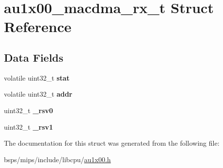\hypertarget{structau1x00__macdma__rx__t}{}\section{au1x00\+\_\+macdma\+\_\+rx\+\_\+t Struct Reference}
\label{structau1x00__macdma__rx__t}
\subsection*{Data Fields}
\begin{DoxyCompactItemize}
\item 
\mbox{\label{structau1x00__macdma__rx__t_a10fff52a98e49df1d3680896ecc9d660}} 
volatile uint32\+\_\+t {\bfseries stat}
\item 
\mbox{\label{structau1x00__macdma__rx__t_adac80c0a16dfa2797b93c7f885be0138}} 
volatile uint32\+\_\+t {\bfseries addr}
\item 
\mbox{\label{structau1x00__macdma__rx__t_accabde7b11a9061abfa6e61850d8f256}} 
uint32\+\_\+t {\bfseries \+\_\+rsv0}
\item 
\mbox{\label{structau1x00__macdma__rx__t_a09a7e0d829262382966e221195c70d71}} 
uint32\+\_\+t {\bfseries \+\_\+rsv1}
\end{DoxyCompactItemize}


The documentation for this struct was generated from the following file\+:\begin{DoxyCompactItemize}
\item 
bsps/mips/include/libcpu/\mbox{\hyperlink{au1x00_8h}{au1x00.\+h}}\end{DoxyCompactItemize}
